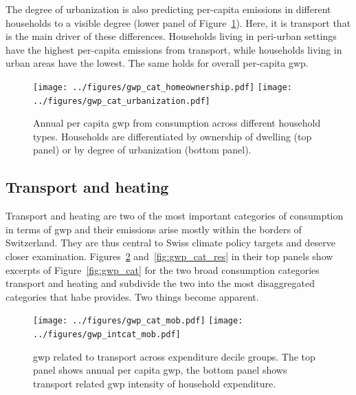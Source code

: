 \documentclass[a4paper,11pt,abstract=true]{scrartcl}
\begin{document}
The degree of urbanization is also predicting per-capita emissions in different households to a visible degree (lower panel of Figure~\ref{fig:gwp_cat_other}).
Here, it is transport that is the main driver of these differences.
Households living in peri-urban settings have the highest per-capita emissions from transport, while households living in urban areas have the lowest.
The same holds for overall per-capita \ac{gwp}.

\begin{figure}[htp]
  \centering
  \texttt{[image: ../figures/gwp\_cat\_homeownership.pdf]}
  \texttt{[image: ../figures/gwp\_cat\_urbanization.pdf]}
  \caption[\ac{gwp} per decile]{
    Annual per capita \ac{gwp} from consumption across different household types.
    Households are differentiated by ownership of dwelling (top panel) or by degree of urbanization (bottom panel).
  }
  \label{fig:gwp_cat_other}
\end{figure}

\clearpage

\subsection{Transport and heating}
\label{sec:heat_tran}

Transport and heating are two of the most important categories of consumption in terms of \ac{gwp} and their emissions arise mostly within the borders of Switzerland.
They are thus central to Swiss climate policy targets and deserve closer examination.
Figures~\ref{fig:gwp_cat_mob} and~\ref{fig:gwp_cat_res} in their top panels show excerpts of Figure~\ref{fig:gwp_cat} for the two broad consumption categories transport and heating and subdivide the two into the most disaggregated categories that \ac{habe} provides.
Two things become apparent.

\begin{figure}[htp]
  \centering
  \texttt{[image: ../figures/gwp\_cat\_mob.pdf]}
  \texttt{[image: ../figures/gwp\_intcat\_mob.pdf]}
  \caption[\ac{gwp} per decile]{
    \ac{gwp} related to transport across expenditure decile groups.
    The top panel shows annual per capita \ac{gwp}, the bottom panel shows transport related \ac{gwp} intensity of household expenditure.
  }
  \label{fig:gwp_cat_mob}
\end{figure}
\end{document}
